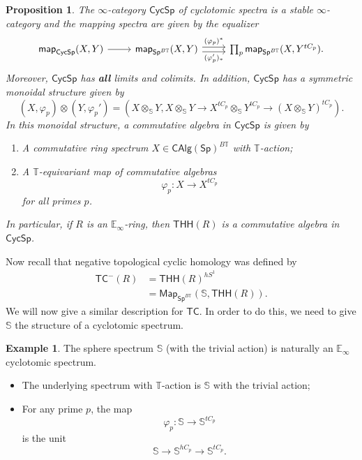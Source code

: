 \documentclass[10pt, oneside]{memoir}
\newtheorem{prop}[thm]{Proposition}
\theoremstyle{definition}
\newtheorem{exm}[thm]{Example}
\theoremstyle{remark}
\theoremstyle{plain}
\theoremstyle{definition}
\theoremstyle{remark}
\newcommand{\E}{\mathbb{E}}
\newcommand{\bS}{\mathbb{S}}
\newcommand{\T}{\mathbb{T}}
\newcommand{\ms}[1]{\mathsf{#1}}
\newcommand{\1}{\mathbf{1}}
\newcommand{\2}{\mathbf{2}}
\newcommand{\3}{\mathbf{3}}
\newcommand{\THH}{\ms{THH}}
\newcommand{\TC}{\ms{TC}}
\begin{document}
\begin{prop}
    The \(\infty \)-category \(\ms{CycSp} \) of cyclotomic spectra is a stable \(\infty \)-category and the mapping spectra are given by the equalizer
    \begin{equation*}
        \begin{tikzcd}
            \ms{map}_{\ms{CycSp}}(X, Y) \ar{r} & \ms{map}_{\ms{Sp}^{B\T}}(X,Y) \ar[shift left=1]{r}{(\varphi_p)^*} \ar[shift right=1]{r}[swap]{(\varphi_p')_*} & \prod_p \ms{map}_{\ms{Sp}^{B\T}}(X, Y^{tC_p}).
        \end{tikzcd}
    \end{equation*}
    Moreover, \(\ms{CycSp} \) has \textbf{all} limits and colimits. In addition, \(\ms{CycSp} \) has a symmetric monoidal structure given by
    \[ (X, \varphi_p) \otimes (Y, \varphi_p') = (X \otimes_{\bS} Y, X \otimes_{\bS} Y \to X^{tC_p} \otimes_{\bS} Y^{tC_p} \to (X \otimes_{\bS} Y)^{tC_p}). \]
    In this monoidal structure, a commutative algebra in \(\ms{CycSp} \) is given by
    \begin{enumerate}
        \item A commutative ring spectrum \(X \in \ms{CAlg}(\ms{Sp})^{B\T} \) with \(\T \)-action;
        \item A \(\T \)-equivariant map of commutative algebras
        \[ \varphi_p \colon X \to X^{tC_p} \]
        for all primes \(p \).
    \end{enumerate}
    In particular, if \(R \) is an \(\E_{\infty} \)-ring, then \(\THH(R) \) is a commutative algebra in \(\ms{CycSp} \).
\end{prop}

Now recall that negative topological cyclic homology was defined by
\begin{align*}
    \ms{TC}^-(R) &= \THH(R)^{hS^1} \\
    &= \ms{Map}_{\ms{Sp}^{B\T}}(\bS, \THH(R)).
\end{align*}
We will now give a similar description for \(\TC \). In order to do this, we need to give \(\bS \) the structure of a cyclotomic spectrum.

\begin{exm}
    The sphere spectrum \(\bS \) (with the trivial action) is naturally an \(\E_{\infty} \) cyclotomic spectrum.
    \begin{itemize}
        \item The underlying spectrum with \(\T \)-action is \(\bS \) with the trivial action;
        \item For any prime \(p \), the map
        \[ \varphi_p \colon \bS \to \bS^{tC_p} \]
        is the unit
        \[ \bS \to \bS^{hC_p} \to \bS^{tC_p}. \]
    \end{itemize}
\end{exm}
\end{document}
